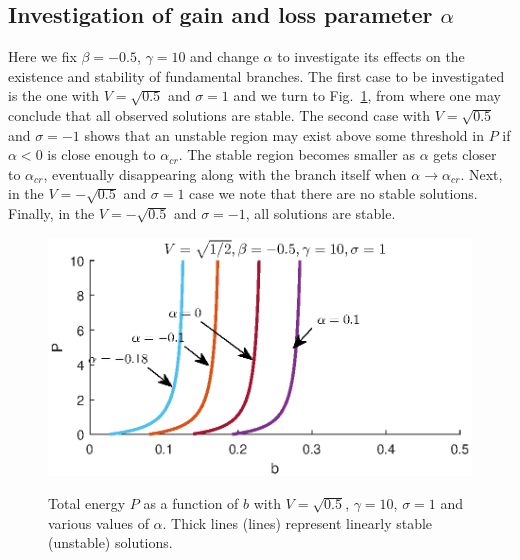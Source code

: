 \documentclass[aps,pre,showpacs,twocolumn]{revtex4}
\begin{document}
\subsection{Investigation of gain and loss parameter $\alpha$}
		Here we fix $\beta=-0.5$, $\gamma=10$ and change $\alpha$ to investigate its effects on the existence and stability of fundamental branches. The first case to be investigated is the one with $V=\sqrt{0.5}$ and $\sigma=1$ and we turn to Fig.~\ref{fig:branches_V05_sat10_ds-05_sigma1}, from where one may conclude that all observed solutions are stable. The second case with $V=\sqrt{0.5}$ and $\sigma=-1$ shows that an unstable region may exist above some threshold in $P$ if $\alpha<0$ is close enough to $\alpha_{cr}$. The stable region becomes smaller as $\alpha$ gets closer to $\alpha_{cr}$, eventually disappearing along with the branch itself when $\alpha\to\alpha_{cr}$. Next, in the $V=-\sqrt{0.5}$ and $\sigma=1$ case we note that there are no stable solutions. Finally, in the $V=-\sqrt{0.5}$ and $\sigma=-1$, all solutions are stable.
\begin{figure}[!htb]
\begin{center}
\scalebox{.7} {\includegraphics{branches_V05_sat10_ds-05_sigma1.eps}}
\end{center}
\caption{Total energy $P$ as a function of $b$ with $V=\sqrt{0.5}$, $\gamma=10$, $\sigma=1$ and various values of $\alpha$. Thick lines (lines) represent linearly stable (unstable) solutions.}
\label{fig:branches_V05_sat10_ds-05_sigma1}
\end{figure}
\end{document}
